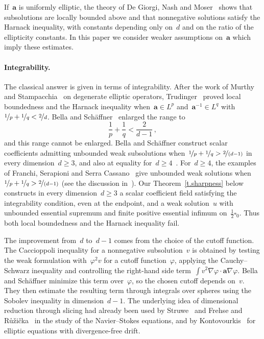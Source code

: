 \documentclass[11pt,letterpaper]{article}
\numberwithin{equation}{section}
\theoremstyle{definition}
\renewcommand{\a}{\mathbf{a}}
\newcommand{\nf}{\nicefrac}
\newcommand{\cu}{\square}
\begin{document}
\smallskip

If~$\a$ is uniformly elliptic, the theory of De Giorgi, Nash and Moser~\cite{DeGiorgi,Nash,Moser1,Moser2} shows that subsolutions are locally bounded above and that nonnegative solutions satisfy the Harnack inequality, with constants depending only on~$d$ and on the ratio of the ellipticity constants. In this paper we consider weaker assumptions on~$\a$ which imply these estimates.

\paragraph{Integrability.} The classical answer is given in terms of integrability. After the work of Murthy and Stampacchia~\cite{Murthy.Stampacchia} on degenerate elliptic operators, Trudinger~\cite{Trudinger,Trudinger.1973} proved local boundedness and the Harnack inequality when~$\a\in L^p$ and~$\a^{-1}\in L^q$ with~$\nf1p+\nf1q<\nf2d$. Bella and Sch\"affner~\cite{Bella.Schaffner.regularity} enlarged the range to
\begin{equation}
	\frac1p+\frac1q<\frac2{d-1}\,,
	\label{e.intro.bs.range}
\end{equation}
and this range cannot be enlarged. Bella and Sch\"affner construct scalar coefficients admitting unbounded weak subsolutions when~$\nf1p+\nf1q>\nf2{(d-1)}$ in every dimension~$d\geq3$, and also at equality for~$d\geq4$~\cite{Bella.Schaffner.plaplace}. For~$d\geq4$, the examples of Franchi, Serapioni and Serra Cassano~\cite{FSS} give unbounded weak solutions when~$\nf1p+\nf1q>\nf2{(d-1)}$ (see the discussion in~\cite{Bella.Schaffner.regularity}). Our Theorem~\ref{t.sharpness} below constructs in every dimension~$d\geq3$ a scalar coefficient field satisfying the integrability condition, even at the endpoint, and a weak solution~$u$ with unbounded essential supremum and finite positive essential infimum on~$\frac12\cu_0$. Thus both local boundedness and the Harnack inequality fail.


\smallskip

The improvement from~$d$ to~$d-1$ comes from the choice of the cutoff function. The Caccioppoli inequality for a nonnegative subsolution~$v$ is obtained by testing the weak formulation with~$\varphi^2v$ for a cutoff function~$\varphi$, applying the Cauchy--Schwarz inequality and controlling the right-hand side term~$\int v^2\nabla\varphi\cdot\a\nabla\varphi$. Bella and Sch\"affner minimize this term over~$\varphi$, so the chosen cutoff depends on~$v$. They then estimate the resulting term through integrals over spheres using the Sobolev inequality in dimension~$d-1$. The underlying idea of dimensional reduction through slicing had already been used by Struwe~\cite{Struwe} and Frehse and R\r{u}\v{z}i\v{c}ka~\cite{Frehse.Ruzicka} in the study of the Navier--Stokes equations, and by Kontovourkis~\cite{Kontovourkis} for elliptic equations with divergence-free drift.
\end{document}
